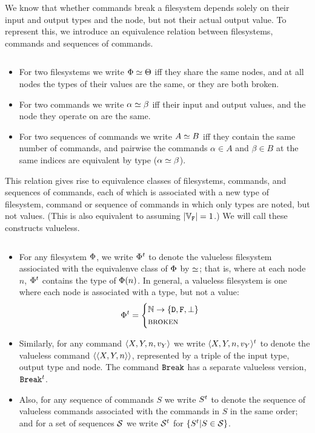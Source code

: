 \bigskip

\noindent
We know that whether commands break a filesystem depends solely on their input and output
types and the node, but not their actual output value.
To represent this, we introduce an equivalence relation between filesystems, commands
and sequences of commands.
\begin{mydef}
$ $ %
\begin{itemize}
\item For two filesystems we write $\Phi\simeq\Theta$ iff they share the same nodes,
and at all nodes the types of their values are the same, or they are both broken.
\item For two commands we write $\alpha\simeq\beta$ iff their input and output values,
and the node they operate on are the same.
\item For two sequences of commands we write $A\simeq B$ iff they contain the same number of commands,
and pairwise the commands $\alpha\in A$ and $\beta\in B$ at the same indices are equivalent by type ($\alpha\simeq\beta$).
\end{itemize}
\end{mydef}

This relation gives rise to equivalence classes of filesystems, commands, and sequences of commands,
each of which is associated with a new type of filesystem, command or sequence of commands in which
only types are noted, but not values.
(This is also equivalent to assuming $|\mathbb{V}_{\mathtt{F}}|=1$.)
We will call these constructs valueless.

\begin{mydef}
$ $
\begin{itemize}
\item For any filesystem $\Phi$, we write $\Phi{}^t$ to denote the valueless filesystem assiociated with
the equivalenve class of $\Phi$ by $\simeq$; that is, where at each node $n$, $\Phi{}^t$ contains the type of
$\Phi(n)$. In general, a valueless filesystem is one where each node
is associated with a type, but not a value:
\begin{gather*}
\Phi{}^t =
\begin{cases}
\mathbb{N} \rightarrow \{\mathtt{D},\mathtt{F},\bot\} \\
\text{\normalfont\scshape{broken}}
\end{cases}
\end{gather*}

\item Similarly, for any command $\langle{X,Y,n,v_Y}\rangle$ we write $\langle{X,Y,n,v_Y}\rangle{}^t$ to denote the valueless command
$\langle\langle{X,Y,n}\rangle\rangle$, represented by a triple of the input type, output type and node.
The command $\mathtt{Break}$ has a separate valueless version, $\mathtt{Break}{}^t$.

\item Also, for any sequence of commands $S$ we write $S{}^t$ to denote the sequence of
valueless commands associated with the commands in $S$ in the same order; and for a set of sequences $\mathcal{S}$
we write $\mathcal{S}{}^t$ for $\{S{}^t|S\in\mathcal{S}\}$.

\end{itemize}
\end{mydef}

